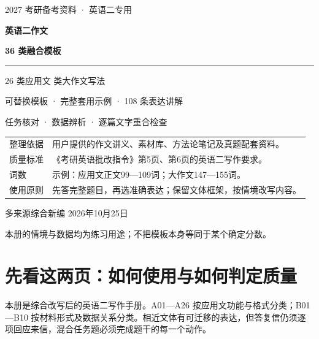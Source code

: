 \documentclass[11pt,a4paper,fontset=macnew]{ctexart}
\begin{document}
\thispagestyle{empty}
\vspace*{25mm}
{\small 2027 考研备考资料 · 英语二专用}\par
\vspace{12mm}
{\fontsize{31}{39}\selectfont\bfseries 英语二作文}\par
\vspace{4mm}
{\fontsize{23}{31}\selectfont\bfseries 36 类融合模板}\par
\vspace{10mm}
\rule{\linewidth}{1pt}\par
\vspace{5mm}
{\Large 26 类应用文  类大作文写法}\par
\vspace{6mm}
可替换模板 · 完整套用示例 · 108 条表达讲解\par
任务核对 · 数据辨析 · 逐篇文字重合检查\par
\vspace{14mm}
\begin{tabularx}{\linewidth}{@{}L{30mm}X@{}}
整理依据 & 用户提供的作文讲义、素材库、方法论笔记及真题配套资料。\\[5pt]
质量标准 & 《考研英语批改指令》第5页、第6页的英语二写作要求。\\[5pt]
词数 & 示例：应用文正文99—109词；大作文147—155词。\\[5pt]
使用原则 & 先答完整题目，再选准确表达；保留文体框架，按情境改写内容。\\
\end{tabularx}
\vfill
{\small 多来源综合新编 \quad 2026年10月25日}\par
{\small 本册的情境与数据均为练习用途；不把模板本身等同于某个确定分数。}
\clearpage
{}
\tableofcontents
\clearpage\section*{先看这两页：如何使用与如何判定质量}
本册是综合改写后的英语二写作手册。A01—A26 按应用文功能与格式分类；B01—B10 按材料形式及数据关系分类。相近文体有可迁移的表达，但答复信仍须逐项回应来信，混合任务题必须完成题干的每一个动作。
\end{document}
